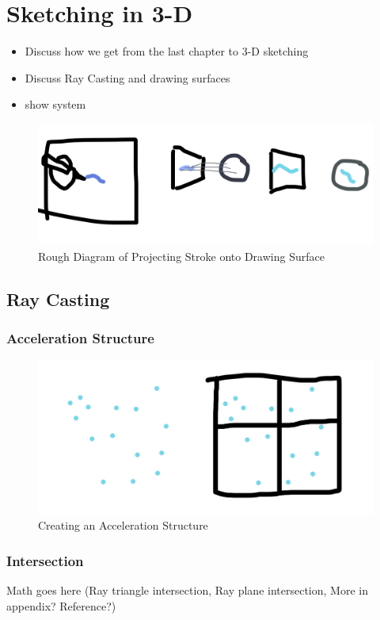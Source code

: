 \documentclass[12pt]{article}
\begin{document}
\pagebreak
\section{Sketching in 3-D}

\begin{itemize}
\item Discuss how we get from the last chapter to 3-D sketching
\item Discuss Ray Casting and drawing surfaces
\item show system
\end{itemize}

\begin{figure}
\includegraphics[width=0.9\linewidth]{StrokeProjection}
\caption{Rough Diagram of Projecting Stroke onto Drawing Surface}
\end{figure}

\subsection{Ray Casting}

\subsubsection{Acceleration Structure}
\begin{figure}[h]
\includegraphics[width=0.9\linewidth]{AccelerationStructureExample}
\caption{Creating an Acceleration Structure}
\end{figure}
\subsubsection{Intersection}
Math goes here (Ray triangle intersection, Ray plane intersection, More in appendix? Reference?)
\end{document}
